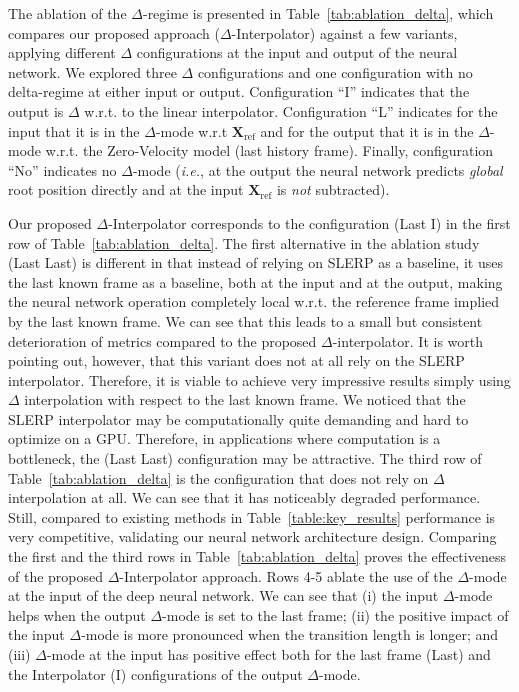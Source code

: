 \documentclass[letterpaper]{article} \usepackage[]{aaai23}  \usepackage{times}  \usepackage{helvet}  \usepackage{courier}  \usepackage[hyphens]{url}  \usepackage{graphicx} \urlstyle{rm} \def\UrlFont{\rm}  \usepackage{natbib}  \usepackage{caption} \frenchspacing  \setlength{\pdfpagewidth}{8.5in} \setlength{\pdfpageheight}{11in}
\renewcommand{\vec}[1]{\mathbf{#1}}
\begin{document}
The ablation of the $\Delta$-regime is presented in Table~\ref{tab:ablation_delta}, which compares our proposed approach ($\Delta$-Interpolator) against a few variants, applying different $\Delta$ configurations at the input and output of the neural network. We explored three $\Delta$ configurations and one configuration with no delta-regime at either input or output. Configuration ``I'' indicates that the output is $\Delta$ w.r.t. to the linear interpolator. Configuration ``L'' indicates for the input that it is in the $\Delta$-mode w.r.t $\vec{X}_{\textrm{ref}}$ and for the output that it is in the $\Delta$-mode w.r.t. the Zero-Velocity model (last history frame). Finally, configuration ``No'' indicates no $\Delta$-mode (\emph{i.e.}, at the output the neural network predicts \emph{global} root position directly and at the input $\vec{X}_{\textrm{ref}}$ is \emph{not} subtracted). 

Our proposed $\Delta$-Interpolator corresponds to the configuration (Last I) in the first row of Table~\ref{tab:ablation_delta}. The first alternative in the ablation study (Last Last) is different in that instead of relying on SLERP as a baseline, it uses the last known frame as a baseline, both at the input and at the output, making the neural network operation completely local w.r.t. the reference frame implied by the last known frame. We can see that this leads to a small but consistent deterioration of metrics compared to the proposed $\Delta$-interpolator. It is worth pointing out, however, that this variant does not at all rely on the SLERP interpolator. Therefore, it is viable to achieve very impressive results simply using $\Delta$ interpolation with respect to the last known frame. We noticed that the SLERP interpolator may be computationally quite demanding and hard to optimize on a GPU. Therefore, in applications where computation is a bottleneck, the (Last Last) configuration may be attractive. The third row of Table~\ref{tab:ablation_delta} is the configuration that does not rely on $\Delta$ interpolation at all. We can see that it has noticeably degraded performance. Still, compared to existing methods in Table~\ref{table:key_results} performance is very competitive, validating our neural network architecture design. Comparing the first and the third rows in Table~\ref{tab:ablation_delta} proves the effectiveness of the proposed $\Delta$-Interpolator approach. Rows 4-5 ablate the use of the $\Delta$-mode at the input of the deep neural network. We can see that (i) the input $\Delta$-mode helps when the output $\Delta$-mode is set to the last frame; (ii) the positive impact of the input $\Delta$-mode is more pronounced when the transition length is longer; and (iii) $\Delta$-mode at the input has positive effect both for the last frame (Last) and the Interpolator (I) configurations of the output $\Delta$-mode.
\end{document}
